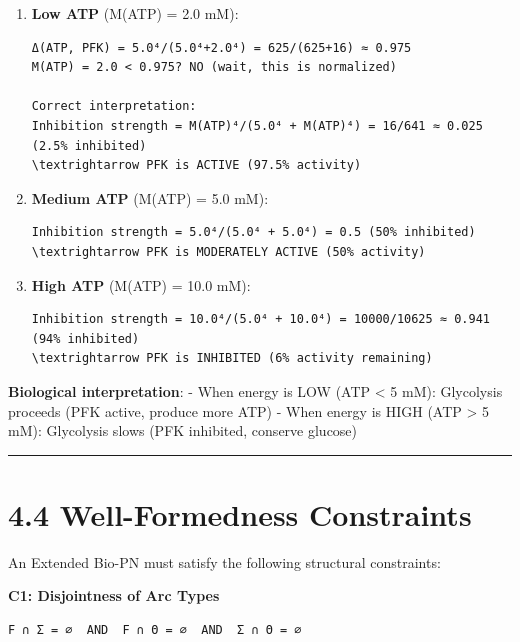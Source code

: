 \begin{enumerate}
\def\labelenumi{\arabic{enumi}.}
\item
  \textbf{Low ATP} (M(ATP) = 2.0 mM):

\begin{lstlisting}
Δ(ATP, PFK) = 5.0⁴/(5.0⁴+2.0⁴) = 625/(625+16) ≈ 0.975
M(ATP) = 2.0 < 0.975? NO (wait, this is normalized)

Correct interpretation:
Inhibition strength = M(ATP)⁴/(5.0⁴ + M(ATP)⁴) = 16/641 ≈ 0.025 (2.5% inhibited)
\textrightarrow PFK is ACTIVE (97.5% activity)
\end{lstlisting}
\item
  \textbf{Medium ATP} (M(ATP) = 5.0 mM):

\begin{lstlisting}
Inhibition strength = 5.0⁴/(5.0⁴ + 5.0⁴) = 0.5 (50% inhibited)
\textrightarrow PFK is MODERATELY ACTIVE (50% activity)
\end{lstlisting}
\item
  \textbf{High ATP} (M(ATP) = 10.0 mM):

\begin{lstlisting}
Inhibition strength = 10.0⁴/(5.0⁴ + 10.0⁴) = 10000/10625 ≈ 0.941 (94% inhibited)
\textrightarrow PFK is INHIBITED (6% activity remaining)
\end{lstlisting}
\end{enumerate}

\textbf{Biological interpretation}: - When energy is LOW (ATP
\textless{} 5 mM): Glycolysis proceeds (PFK active, produce more ATP) -
When energy is HIGH (ATP \textgreater{} 5 mM): Glycolysis slows (PFK
inhibited, conserve glucose)

\begin{center}\rule{0.5\linewidth}{0.5pt}\end{center}

\hypertarget{well-formedness-constraints}{%
\section{4.4 Well-Formedness
Constraints}\label{well-formedness-constraints}}

An Extended Bio-PN must satisfy the following structural constraints:

\textbf{C1: Disjointness of Arc Types}

\begin{lstlisting}
F ∩ Σ = ∅  AND  F ∩ Θ = ∅  AND  Σ ∩ Θ = ∅
\end{lstlisting}

